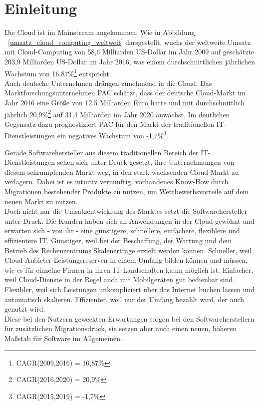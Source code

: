 \section{Einleitung}
Die Cloud ist im Mainstream angekommen.  Wie in 
Abbildung ~\ref{umsatz_cloud_computing_weltweit} darsgestellt, wuchs der 
weltweite Umsatz mit Cloud-Computing von 58,6 Milliarden US-Dollar im 
Jahr 2009 auf geschätzte 203,9 Milliarden US-Dollar im Jahr 2016, was einem 
durchschnittlichen jährlichen Wachstum von 16,87\%\footnote{CAGR(2009,2016) = 
16,87\%} entspricht.  \\
Auch deutsche Unternehmen drängen zunehmend in die Cloud. Das 
Marktforschungsunternehmen PAC schätzt, dass der 
deutsche Cloud-Markt im Jahr 2016 eine Größe von 12,5 Milliarden Euro hatte und 
mit durchschnittlich jährlich 20,9\%\footnote{CAGR(2016,2020) = 20,9\%} auf 31,4 
Milliarden im Jahr 2020 anwächst. Im deutlichen Gegensatz dazu prognostiziert 
PAC für den Markt der traditionellen IT-Dienstleistungen ein negatives Wachstum 
von  -1,7\%\footnote{CAGR(2015,2019) = -1,7\%}. 



Gerade Softwarehersteller aus diesem traditionellen Bereich der 
IT-Dienstleistungen sehen sich unter Druck gesetzt, ihre 
Unternehmungen von diesem schrumpfenden Markt weg, in den stark wachsenden 
Cloud-Markt zu verlagern. Dabei ist es intuitiv vernünftig, vorhandenes 
Know-How durch Migrationen bestehender Produkte zu nutzen, um 
Wettbewerbsvorteile auf dem neuen Markt zu nutzen. \\
Doch nicht nur die Umsatzentwicklung des Marktes setzt die Softwarehersteller 
unter Druck. Die Kunden haben sich an Anwendungen in der Cloud gewöhnt und 
erwarten sich - von ihr - eine günstigere, schnellere, einfachere, flexiblere 
und 
effizientere IT. Günstiger, weil bei der Beschaffung, der Wartung und dem 
Betrieb des Rechenzentrums Skalenerträge erzielt werden können. Schneller, weil 
Cloud-Anbieter Leistungsreserven in einem Umfang bilden können und müssen, wie 
es für einzelne Firmen in ihren IT-Landschaften kaum möglich ist. Einfacher, 
weil Cloud-Dienste in der Regel auch mit Mobilgeräten gut bedienbar sind. 
Flexibler, weil sich Leistungen unkompliziert über das Internet buchen lassen 
und automatisch skalieren. Effizienter, weil nur der Umfang bezahlt wird, 
der auch genutzt wird.  \\
Diese bei den Nutzern geweckten Erwartungen sorgen bei den Softwareherstellern 
für zusätzlichen Migrationsdruck, sie setzen aber auch einen neuen, höheren 
Maßstab für Software im Allgemeinen.\\

